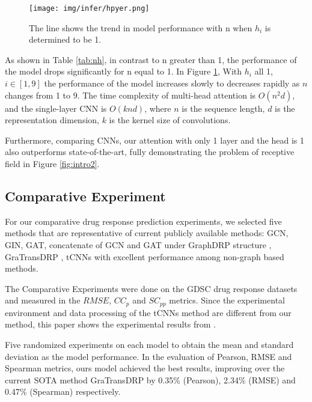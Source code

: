 \documentclass{article}
\begin{document}
\begin{figure}[htbp]
	\centering
    \texttt{[image: img/infer/hpyer.png]}\label{fig:3b}
	
	\caption{The line shows the trend in model performance with n when $h_i$ is determined to be 1.
	}
	\label{fig:SAH}
\end{figure}

As shown in Table \ref{tab:nh}, in contrast to n greater than 1, the performance of the model drops significantly for n equal to 1. In Figure \ref{fig:SAH}, With $h_i$ all 1, $i \in [1,9]$ the performance of the model increases slowly to decreases rapidly as $n$ changes from 1 to 9.
The time complexity of multi-head attention is $O(n^2d)$, and the single-layer CNN is $O(knd)$, where $n$ is the sequence length, $d$ is the representation dimension, $k$ is the kernel size of convolutions.

Furthermore, comparing CNNs, our attention with only 1 layer and the head is 1 also outperforms state-of-the-art, fully demonstrating the problem of receptive field in Figure \ref{fig:intro2}.










 
\subsection{Comparative Experiment}




For our comparative drug response prediction experiments, we selected five methods that are representative of current publicly available methods: GCN, GIN, GAT, concatenate of GCN and GAT under GraphDRP \cite{110bGCNforDRP} structure , GraTransDRP \cite{GraTransDRP}, tCNNs \cite{tcnns} with excellent performance among non-graph based methods.

The Comparative Experiments were done on the GDSC drug response datasets and measured in the $RMSE$, $CC_p$ and $SC_{pp}$ metrics. Since the experimental environment and data processing of the tCNNs method are different from our method, this paper shows the experimental results from \cite{110bGCNforDRP}.



Five randomized experiments on each model to obtain the mean and standard deviation as the model performance.
In the evaluation of Pearson, RMSE and Spearman metrics, ours model achieved the best results, improving over the current SOTA method GraTransDRP by 0.35\% (Pearson), 2.34\% (RMSE) and 0.47\% (Spearman) respectively. 
\end{document}
